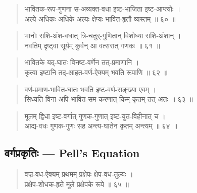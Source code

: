 \documentclass[11pt,a4paper]{article}
\newcommand{\dev}[1]{{\devanagarifont #1}}
\newenvironment{shloka}{\begin{verse}\devanagarifont\large}{\end{verse}}
\begin{document}
\begin{shloka}
भावितक-रूप-गुणना स-अव्यक्त-वधा इष्ट-भाजिता इष्ट-आप्त्योः ।\\
अल्पे अधिकः अधिके अल्पः क्षेप्यः भावित-हृतौ व्यस्तम् ॥ ६० ॥
\end{shloka}

\vspace{0.3cm}

\begin{shloka}
भानोः राशि-अंश-वधात् त्रि-चतुर्-गुणितान् विशोध्या राशि-अंशान् ।\\
नवतिम् दृष्ट्वा सूर्यम् कुर्वन् आ वत्सरात् गणकः ॥ ६१ ॥
\end{shloka}

\vspace{0.3cm}

\begin{shloka}
भावितके यद्-घातः विनष्ट-वर्णेन तत्-प्रमाणानि ।\\
कृत्वा इष्टानि तद्-आहत-वर्ण-ऐक्यम् भवति रूपाणि ॥ ६२ ॥
\end{shloka}

\vspace{0.3cm}

\begin{shloka}
वर्ण-प्रमाण-भावित-घातः भवति इष्ट-वर्ण-सङ्ख्या एवम् ।\\
सिध्यति विना अपि भावित-सम-करणात् किम् कृतम् तत् अतः ॥ ६३ ॥
\end{shloka}

\vspace{0.3cm}

\begin{shloka}
मूलम् द्विधा इष्ट-वर्गात् गुणक-गुणात् इष्ट-युत-विहीनात् च ।\\
आद्य-वधः गुणक-गुणः सह अन्त्य-घातेन कृतम् अन्त्यम् ॥ ६४ ॥
\end{shloka}

\newpage

\subsection*{\dev{वर्गप्रकृतिः — Pell's Equation}}

\begin{shloka}
वज्र-वध-ऐक्यम् प्रथमम् प्रक्षेपः क्षेप-वध-तुल्यः ।\\
प्रक्षेप-शोधक-हृते मूले प्रक्षेपके रूपे ॥ ६५ ॥
\end{shloka}
\end{document}
